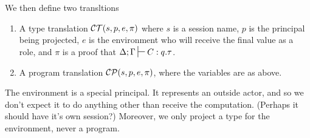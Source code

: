 \documentclass{article}
\theoremstyle{definition}
\newcommand{\proves}[1][]{\sststile{}{#1}}
\begin{document}
We then define two transltions
\begin{enumerate}
\item A type translation $\mathcal{C}\mathcal{T}(s, p, e, \pi)$ where $s$ is a session name, $p$ is the principal being projected, $e$ is the environment who will receive the final value as a role, and $\pi$ is a proof that $\Delta; \Gamma \proves C : q.\tau$.
\item A program translation $\mathcal{C}\mathcal{P}(s, p, e, \pi)$, where the variables are as above.
\end{enumerate}

The environment is a special principal.
It represents an outside actor, and so we don't expect it to do anything other than receive the computation.
(Perhaps it should have it's own session?)
Moreover, we only project a type for the environment, never a program.
\end{document}
